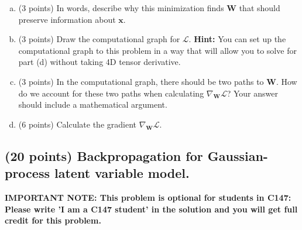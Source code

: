 \documentclass{article}
\begin{document}
\begin{enumerate}[(a)]
    \item (3 points) In words, describe why this minimization finds $\mathbf{W}$ that should preserve information about $\mathbf{x}$.
    
    \begin{shaded}
    \end{shaded}
    
    \item (3 points) Draw the computational graph for $\mathcal{L}$. \textbf{Hint:} You can set up the computational graph to this problem in a way that will allow you to solve for part (d) without taking 4D tensor derivative.
    
    \begin{shaded}
    \end{shaded}
    
    \item (3 points) In the computational graph, there should be two paths to $\mathbf{W}$. How do we account for these two paths when calculating $\nabla_{\mathbf{W}}\mathcal{L}$? Your answer should include a mathematical argument.
    
    \begin{shaded}
    \end{shaded}
    
    \item (6 points) Calculate the gradient $\nabla_{\mathbf{W}}\mathcal{L}$. 
    
    \begin{shaded}
    \end{shaded}


\end{enumerate}


\pagebreak %


\subsection*{(20 points) Backpropagation for Gaussian-process latent variable model. \newline}

\begin{center}
    \textbf{IMPORTANT NOTE: This problem is optional for students in C147: Please write ’I am a C147 student’ in the solution and you will get full credit for this problem.}
\end{center}
\end{document}
